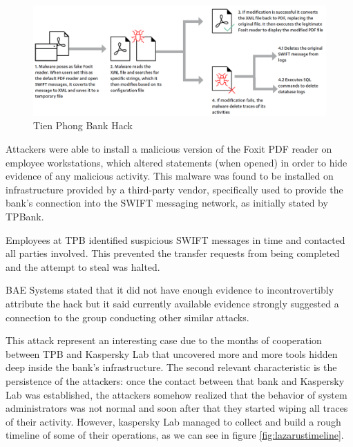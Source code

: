 \documentclass[12pt]{article}
\begin{document}
        \begin{figure}[H]
        \centering
        \includegraphics[width=\textwidth]{figures/vietnam.png}
        \caption{Tien Phong Bank Hack}
        \label{fig:VietnamHacks}
        \end{figure}

        Attackers were able to install a malicious version of the Foxit PDF reader on employee workstations, which altered statements (when opened) in order to hide evidence of any malicious activity. This malware was found to be installed on infrastructure provided by a third-party vendor, specifically used to provide the bank’s connection into the SWIFT messaging network, as initially stated by TPBank.
        
        Employees at TPB identified suspicious SWIFT messages in time and contacted all parties involved. This prevented the transfer requests from being completed and the attempt to steal was halted.
        
        BAE Systems stated that it did not have enough evidence to incontrovertibly attribute the hack but it said currently available evidence strongly suggested a connection to the group conducting other similar attacks.\cite{VietnameseBankBlocks}
        
        This attack represent an interesting case due to the months of cooperation between TPB and Kaspersky Lab that uncovered more and more tools hidden deep inside the bank's infrastructure. The second relevant characteristic is the persistence of the attackers: once the contact between that bank and Kaspersky Lab was established, the attackers somehow realized that the behavior of system administrators was not normal and soon after that they started wiping all traces of their activity. However, kaspersky Lab managed to collect and build a rough timeline of some of their operations, as we can see in figure \ref{fig:lazarustimeline}. 
        
\end{document}
